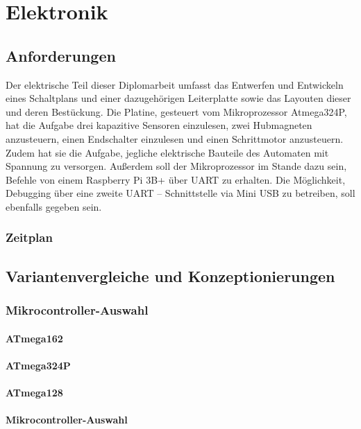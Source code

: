 \chapter{Elektronik}

\section{Anforderungen}

Der elektrische Teil dieser Diplomarbeit umfasst das Entwerfen und Entwickeln eines Schaltplans und einer dazugehörigen Leiterplatte sowie das Layouten dieser und deren Bestückung.
Die Platine, gesteuert vom Mikroprozessor Atmega324P, hat die Aufgabe drei kapazitive Sensoren einzulesen, zwei Hubmagneten anzusteuern, einen Endschalter einzulesen und einen Schrittmotor anzusteuern. Zudem hat sie die Aufgabe, jegliche elektrische Bauteile des Automaten mit Spannung zu versorgen.
Außerdem soll der Mikroprozessor im Stande dazu sein, Befehle von einem Raspberry Pi 3B+ über UART zu erhalten. Die Möglichkeit, Debugging über eine zweite UART – Schnittstelle via Mini USB zu betreiben, soll ebenfalls gegeben sein.

\subsection{Zeitplan}

\section{Variantenvergleiche und Konzeptionierungen}
\subsection{Mikrocontroller-Auswahl}
\subsubsection{ATmega162}
\subsubsection{ATmega324P}
\subsubsection{ATmega128}
\subsubsection{Mikrocontroller-Auswahl}


